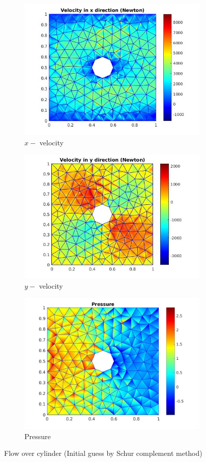 \documentclass[a4paper,openany]{book}
\begin{document}
\begin{figure}
  \begin{subfigure}{\textwidth}
    \includegraphics[width=0.8\linewidth]{cylinder_newton_vx_schur.jpg}
    \caption{$x-$ velocity}
  \label{x_vel_navier_stoke_schur}
  \end{subfigure}
  \begin{subfigure}{\textwidth}
    \includegraphics[width=0.8\linewidth]{cylinder_newton_vy_schur.jpg}
    \caption{$y-$ velocity}
  \label{y_vel_navier_stoke_schur}
  \end{subfigure}
  \begin{subfigure}{\textwidth}
    \includegraphics[width=0.8\linewidth]{cylinder_newton_pressure_schur.jpg}
    \caption{Pressure}
  \label{pressure_navier_stoke_schur}
  \end{subfigure}
\caption{Flow over cylinder (Initial guess by Schur complement method)}
\label{flow_over_cylinder_schur_n_s}
\end{figure}
\end{document}

